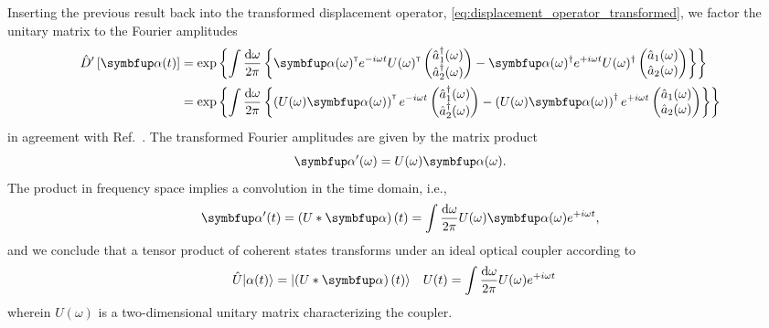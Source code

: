 Inserting the previous result back into the transformed displacement operator, \cref{eq:displacement_operator_transformed}, we factor the unitary matrix to the Fourier amplitudes
\begin{equation}
	\begin{split}
		\hat{D}^\prime\left[\vb{\alpha}(t)\right]
		&=
		\exp\left\{
			\int\frac{\dd{\omega}}{2\pi}
			\left\{
				\vb{\alpha}(\omega)^\trans
				e^{-i\omega t}
				U(\omega)^\trans
				\begin{pmatrix}
					\hat{a}_1^\dagger(\omega) \\
					\hat{a}_2^\dagger(\omega)
				\end{pmatrix}
				-
				\vb{\alpha}(\omega)^\dagger
				e^{+i\omega t}
				U(\omega)^\dagger
				\begin{pmatrix}
					\hat{a}_1(\omega) \\
					\hat{a}_2(\omega)
				\end{pmatrix}
			\right\}
		\right\}
		\\
		&=
		\exp\left\{
			\int\frac{\dd{\omega}}{2\pi}
			\left\{
				\left(
					U(\omega)
					\vb{\alpha}(\omega)
				\right)^\trans
				e^{-i\omega t}
				\begin{pmatrix}
					\hat{a}_1^\dagger(\omega) \\
					\hat{a}_2^\dagger(\omega)
				\end{pmatrix}
				-
				\left(
					U(\omega)
					\vb{\alpha}(\omega)
				\right)^\dagger
				e^{+i\omega t}
				\begin{pmatrix}
					\hat{a}_1(\omega) \\
					\hat{a}_2(\omega)
				\end{pmatrix}
			\right\}
		\right\}
	\end{split}
\end{equation}
in agreement with Ref.~\cite[p.~210]{Vogel2006}.
The transformed Fourier amplitudes are given by the matrix product
\begin{equation}
	\vb{\alpha}^\prime(\omega)
	=
	U(\omega)
	\vb{\alpha}(\omega)
	\label{eq:coupler_coherent_amplitudes_frequency}
	.
\end{equation}
The product in frequency space implies a convolution in the time domain, i.e.,
\begin{equation}
	\vb{\alpha}^\prime(t)
	=
	\left(U\conv\vb{\alpha}\right)(t)
	=
	\int\frac{\dd{\omega}}{2\pi}
	U(\omega)
	\vb{\alpha}(\omega)
	e^{+i\omega t}
	\label{eq:coupler_coherent_amplitudes_time}
	,
\end{equation}
and we conclude that a tensor product of coherent states transforms under an ideal optical coupler according to
\begin{align}
	\hat{U}
	\ket*{\alpha(t)}
	&=
	\ket*{\left(U\conv\vb{\alpha}\right)(t)}	
	&
	U(t)
	&=
	\int\frac{\dd{\omega}}{2\pi}
	U(\omega)
	e^{+i\omega t}
	\label{eq:coupler_coherent_state}
\end{align}
wherein $U(\omega)$ is a two-dimensional unitary matrix characterizing the coupler.

